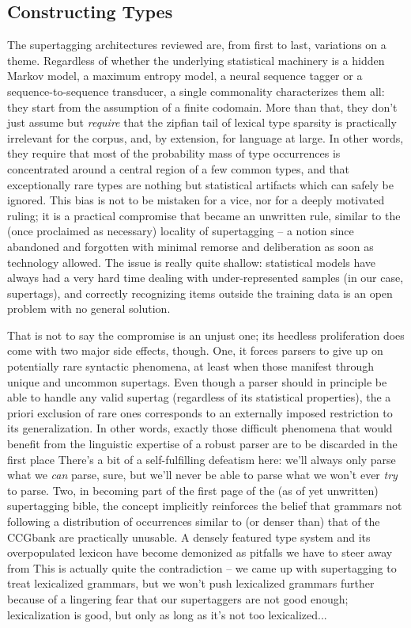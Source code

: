 \subsection{Constructing Types}
The supertagging architectures reviewed are, from first to last, variations on a theme.
Regardless of whether the underlying statistical machinery is a hidden Markov model, a maximum entropy model, a neural sequence tagger or a sequence-to-sequence transducer, a single commonality characterizes them all: they start from the assumption of a finite codomain.
More than that, they don't just assume but \textit{require} that the zipfian tail of lexical type sparsity is practically irrelevant for the corpus, and, by extension, for language at large.
In other words, they require that most of the probability mass of type occurrences is concentrated around a central region of a few common types, and that exceptionally rare types are nothing but statistical artifacts which can safely be ignored.
This bias is not to be mistaken for a vice, nor for a deeply motivated ruling; it is a practical compromise that became an unwritten rule, similar to the (once proclaimed as necessary) locality of supertagging -- a notion since abandoned and forgotten with minimal remorse and deliberation as soon as technology allowed.
The issue is really quite shallow: statistical models have always had a very hard time dealing with under-represented samples (in our case, supertags), and correctly recognizing items outside the training data is an open problem with no general solution.

That is not to say the compromise is an unjust one; its heedless proliferation does come with two major side effects, though.
One, it forces parsers to give up on potentially rare syntactic phenomena, at least when those manifest through unique and uncommon supertags.
Even though a parser should in principle be able to handle any valid supertag (regardless of its statistical properties), the a priori exclusion of rare ones corresponds to an externally imposed restriction to its generalization.
In other words, exactly those difficult phenomena that would benefit from the linguistic expertise of a robust parser are to be discarded in the first place
There's a bit of a self-fulfilling defeatism here: we'll always only parse what we \textit{can} parse, sure, but we'll never be able to parse what we won't ever \textit{try} to parse.
Two, in becoming part of the first page of the (as of yet unwritten) supertagging bible, the concept implicitly reinforces the belief that grammars not following a distribution of occurrences similar to (or denser than) that of the CCGbank are practically unusable.
A densely featured type system and its overpopulated lexicon have become demonized as pitfalls we have to steer away from
This is actually quite the contradiction -- we came up with supertagging to treat lexicalized grammars, but we won't push lexicalized grammars further because of a lingering fear that our supertaggers are not good enough; lexicalization is good, but only as long as it's not too lexicalized...

